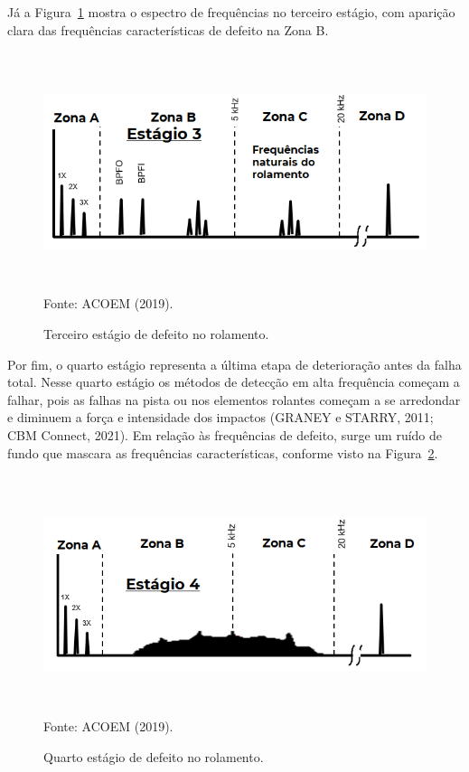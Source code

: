 \documentclass[
	12pt,				
	oneside,			
	a4paper,			
	english,			
	brazil,	
	sumario=abnt-6027-2012		
	]{abntex2ppgsi}
\begin{document}
Já a Figura~\ref{estagio_3} mostra o espectro de frequências no terceiro estágio, com aparição clara das frequências características de defeito na Zona B.

\begin{figure}[H]
\centering
\caption {Terceiro estágio de defeito no rolamento.}
\includegraphics[width=\textwidth,height=70mm,keepaspectratio]{estagio_3}  \\
Fonte: ACOEM (2019).
\label{estagio_3}
\end{figure}

Por fim, o quarto estágio representa a última etapa de deterioração antes da falha total. Nesse quarto estágio os métodos de detecção em alta frequência começam a falhar, pois as falhas na pista ou nos elementos rolantes começam a se arredondar e diminuem a força e intensidade dos impactos (GRANEY e STARRY, 2011; CBM Connect, 2021). Em relação às frequências de defeito, surge um ruído de fundo que mascara as frequências características, conforme visto na Figura~\ref{estagio_4}.

\begin{figure}[H]
\centering
\caption {Quarto estágio de defeito no rolamento.}
\includegraphics[width=\textwidth,height=70mm,keepaspectratio]{estagio_4} \\
Fonte: ACOEM (2019).
\label{estagio_4}
\end{figure}
\end{document}
